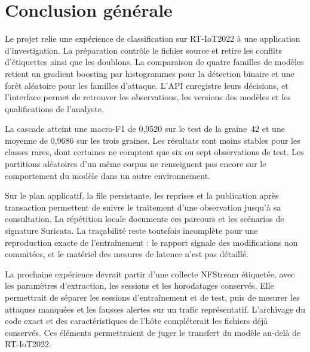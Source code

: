 \chapter*{Conclusion générale}

Le projet relie une expérience de classification sur RT-IoT2022 à une
application d'investigation. La préparation contrôle le fichier source et
retire les conflits d'étiquettes ainsi que les doublons. La comparaison de
quatre familles de modèles retient un gradient boosting par histogrammes pour
la détection binaire et une forêt aléatoire pour les familles d'attaque.
L'API enregistre leurs décisions, et l'interface permet de retrouver les
observations, les versions des modèles et les qualifications de l'analyste.

La cascade atteint une macro-F1 de 0,9520 sur le test de la graine~42 et une
moyenne de 0,9686 sur les trois graines. Les résultats sont moins stables pour
les classes rares, dont certaines ne comptent que six ou sept observations de
test. Les partitions aléatoires d'un même corpus ne renseignent pas encore
sur le comportement du modèle dans un autre environnement.

Sur le plan applicatif, la file persistante, les reprises et la publication
après transaction permettent de suivre le traitement d'une observation jusqu'à
sa consultation. La répétition locale documente ces parcours et les scénarios
de signature Suricata. La traçabilité reste toutefois incomplète pour une
reproduction exacte de l'entraînement : le rapport signale des modifications
non commitées, et le matériel des mesures de latence n'est pas détaillé.

La prochaine expérience devrait partir d'une collecte NFStream étiquetée,
avec les paramètres d'extraction, les sessions et les horodatages conservés.
Elle permettrait de séparer les sessions d'entraînement et de test, puis de
mesurer les attaques manquées et les fausses alertes sur un trafic représentatif.
L'archivage du code exact et des caractéristiques de l'hôte compléterait les
fichiers déjà conservés. Ces éléments permettraient de juger le transfert du
modèle au-delà de RT-IoT2022.

